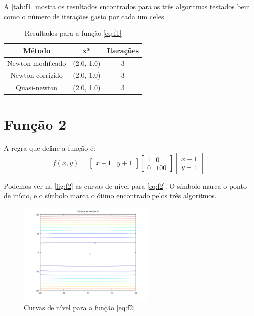 \documentclass[12pt]{article}
\begin{document}
A \autoref{tab:f1} mostra os resultados encontrados para os três algoritmos testados bem como o número de iterações gasto por cada um deles.

\begin{table}[H]
\centering
\begin{tabular}{*3c}
\toprule
Método			&	x*		&	Iterações\\
\midrule
Newton modificado	&	(2.0, 1.0)	&	3\\
Newton corrigido	&	(2.0, 1.0)	&	3\\
Quasi-newton		&	(2.0, 1.0)	&	3\\
\bottomrule
\end{tabular}
\caption{\small{Resultados para a função \autoref{eq:f1} }}
\label{tab:f1}
\end{table}

\section{Função 2}
A regra que define a função é:
\begin{equation}
\label{eq:f2}
f(x, y) = 
	   \begin{bmatrix}
            x - 1 & y + 1
           \end{bmatrix}            
           \begin{bmatrix}
	   1 	& 0 \\
	   0	& 100 
           \end{bmatrix} 
           \begin{bmatrix}
	   x - 1 \\
	   y + 1
           \end{bmatrix}
\end{equation}

Podemos ver na \autoref{fig:f2} as curvas de nível para \autoref{eq:f2}. O símbolo \textit{\textopenbullet} marca o ponto de início,
e o símbolo \textit{\texttimes} marca o ótimo encontrado pelos três algoritmos.

\begin{figure}[H]
  \centering
  \includegraphics[width=250px]{../matlab/images/f2_contour}
  \caption{Curvas de nível para a função \autoref{eq:f2}}
  \label{fig:f2}
\end{figure}
\end{document}
